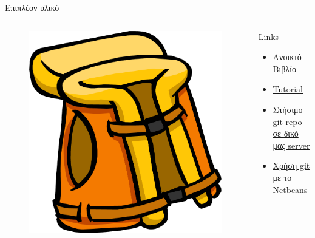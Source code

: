 \documentclass{beamer}
\begin{document}
\begin{frame}{Επιπλέον υλικό}
\begin{columns}
    \begin{figure}
      \includegraphics[scale=0.1]{lifejacket.png} 
    \end{figure}
    \begin{block}{Links}
      \begin{itemize}
	\item  \href{http://git-scm.com/book}{Ανοικτό Βιβλίο}
	\item \href{http://try.github.io/levels/1/challenges/1}{Tutorial}
	\item \href{http://git-scm.com/book/ch4-2.html}{Στήσιμο git repo σε δικό μας server}
	\item \href{https://netbeans.org/kb/docs/ide/git.html}{Χρήση git με το Netbeans}
      \end{itemize}
    \end{block}
\end{columns}
\end{frame}
\end{document}
